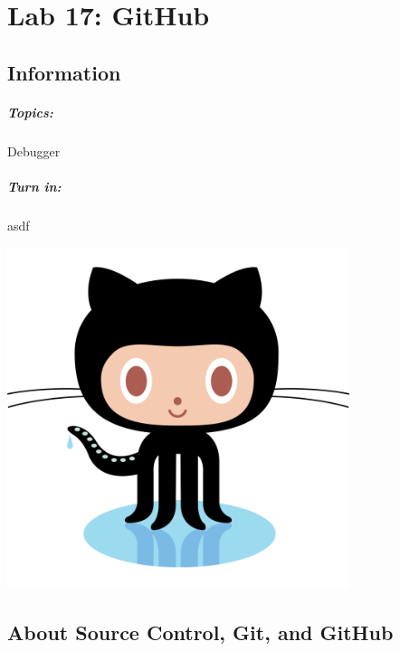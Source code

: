 \documentclass[a4paper,12pt,oneside]{book}
\title{}
\author{Rachel Morris}
\date{\today}
\newcommand{\laLab}{Lab 17: GitHub\ }
\begin{document}
    \chapter*{\laLab} 

        \section{Information}
            \paragraph{ Topics: } Debugger
            \paragraph{ Turn in: } asdf


        \begin{center}
            \includegraphics[width=10cm]{images/octocat.png}
        \end{center}

        \tableofcontents
            

    \newpage

    \section{About Source Control, Git, and GitHub}
\end{document}
